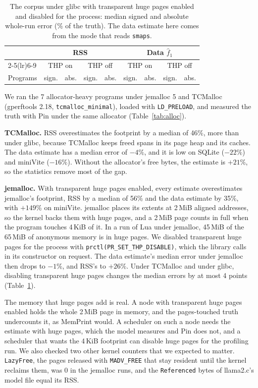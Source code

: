 \documentclass[11pt]{article}
\newcommand{\memprint}{MemPrint}
\newcommand{\tabref}[1]{Table~\ref{#1}}
\begin{document}
\begin{table}[t]
\centering
\small
\caption{The corpus under glibc with transparent huge pages enabled and disabled for the process: median signed and
absolute whole-run error (\% of the truth). The data estimate here comes from the mode that reads \texttt{smaps}.}
\label{tab:thp}
\begin{tabular}{lrrrrrrrr}
\toprule
 & \multicolumn{4}{c}{RSS} & \multicolumn{4}{c}{Data $\hat f_1$} \\
\cmidrule(lr){2-5}\cmidrule(lr){6-9}
 & \multicolumn{2}{c}{THP on} & \multicolumn{2}{c}{THP off} & \multicolumn{2}{c}{THP on} & \multicolumn{2}{c}{THP off} \\
Programs & sign. & abs. & sign. & abs. & sign. & abs. & sign. & abs. \\
\midrule

\bottomrule
\end{tabular}
\end{table}

We ran the 7 allocator-heavy programs under jemalloc 5 and TCMalloc (gperftools 2.18, \texttt{tcmalloc\_minimal}),
loaded with \texttt{LD\_PRELOAD}, and measured the truth with Pin under the same allocator (\tabref{tab:alloc}).

\textbf{TCMalloc.} RSS overestimates the footprint by a median of 46\%, more than under glibc, because TCMalloc keeps
freed spans in its page heap and its caches. The data estimate has a median error of $-4\%$, and it is low on SQLite
($-22\%$) and miniVite ($-16\%$). Without the allocator's free bytes, the estimate is $+21\%$, so the statistics remove
most of the gap.

\textbf{jemalloc.} With transparent huge pages enabled, every estimate overestimates jemalloc's footprint, RSS by a
median of 56\% and the data estimate by 35\%, with $+149\%$ on miniVite. jemalloc places its extents at 2\,MiB aligned
addresses, so the kernel backs them with huge pages, and a 2\,MiB page counts in full when the program touches 4\,KiB
of it. In a run of Lua under jemalloc, 45\,MiB of the 65\,MiB of anonymous memory is in huge pages. We disabled
transparent huge pages for the process with \texttt{prctl(PR\_SET\_THP\_DISABLE)}, which the library calls in its
constructor on request. The data estimate's median error under jemalloc then drops to $-1\%$, and RSS's to $+26\%$.
Under TCMalloc and under glibc, disabling transparent huge pages changes the median errors by at most 4 points
(\tabref{tab:thp}).

The memory that huge pages add is real. A node with transparent huge pages enabled holds the whole 2\,MiB page in
memory, and the pages-touched truth undercounts it, as \memprint{} would. A scheduler on such a node needs the estimate
with huge pages, which the model measures and Pin does not, and a scheduler that wants the 4\,KiB footprint can disable
huge pages for the profiling run. We also checked two other kernel counters that we expected to matter.
\texttt{LazyFree}, the pages released with \texttt{MADV\_FREE} that stay resident until the kernel reclaims them, was 0
in the jemalloc runs, and the \texttt{Referenced} bytes of llama2.c's model file equal its RSS.
\end{document}
